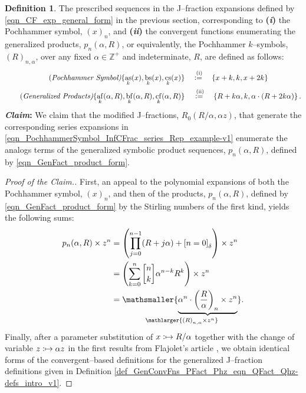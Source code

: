 \documentclass[12pt,reqno]{article}
\numberwithin{sfootnote}{section}
\numberwithin{equation}{section}
\theoremstyle{DefaultTheoremStyle}
\theoremstyle{definition}
\newtheorem{definition}[theorem]{Definition}
\newcommand{\defequals}{\ensuremath{\vcentcolon=}}
\newcommand{\defmapsto}{\ensuremath{\vcentcolon\mapsto}}
\newcommand{\undersetbrace}[2]{\ensuremath{\underset{\mathlarger{#1}}{\mathsmaller{\underbrace{#2}}}}}
\newcommand{\gkpSI}[2]{\ensuremath{\genfrac{\lbrack}{\rbrack}{0pt}{}{#1}{#2}}}
\newcommand{\Pochhammer}[2]{\ensuremath{\left(#1\right)_{#2}}}
\newcommand{\Iverson}[1]{\ensuremath{\left[#1\right]_{\delta}}}
\newcommand{\pn}[3]{\ensuremath{p_{#1}\left(#2, #3\right)}}
\DeclareMathOperator{\as}{as}
\DeclareMathOperator{\bs}{bs}
\DeclareMathOperator{\cs}{cs}
\DeclareMathOperator{\af}{af}
\DeclareMathOperator{\bfcf}{bf}
\DeclareMathOperator{\cfcf}{cf}
\begin{document}
\begin{definition} 
The prescribed sequences in the J--fraction expansions defined by 
\eqref{eqn_CF_exp_general_form} in the previous section, corresponding to 
\textbf{(\emph{i})} the 
Pochhammer symbol, $\Pochhammer{x}{n}$, and 
\textbf{(\emph{ii})} the 
convergent functions enumerating the generalized products, 
$\pn{n}{\alpha}{R}$, or equivalently, the 
Pochhammer $k$--symbols, $\Pochhammer{R}{n,\alpha}$, 
over any fixed $\alpha \in \mathbb{Z}^{+}$ and 
indeterminate, $R$, are defined as follows: 
\begin{align*} 
\tag{\em Pochhammer Symbol} 
\{\as_k(x), \bs_k(x), \cs_k(x)\} & 
     \quad\overset{\text{ (i)}}{\defequals}\quad 
     \left\{ x+k, k, x+2k \right\} \\ 
\tag{\em Generalized Products} 
\{\af_k(\alpha, R), \bfcf_k(\alpha, R), \cfcf_k(\alpha, R)\} & 
     \quad\overset{\text{ (ii)}}{\defequals}\quad 
     \left\{ 
     R+k\alpha, k, \alpha \cdot (R+2k \alpha) 
     \right\}.  
\end{align*} 
\textbf{\textit{Claim}:} 
We claim that the modified J--fractions, $R_0(R / \alpha, \alpha z)$, 
that generate the corresponding series expansions in 
\eqref{eqn_PochhammerSymbol_InfCFrac_series_Rep_example-v1} 
enumerate the analogs terms of the generalized 
symbolic product sequences, $\pn{n}{\alpha}{R}$, 
defined by \eqref{eqn_GenFact_product_form}. 
\end{definition} 
\begin{proof}[Proof of the Claim.] 
First, an appeal to the polynomial expansions of both the 
Pochhammer symbol, $\Pochhammer{x}{n}$, and 
then of the products, $\pn{n}{\alpha}{R}$, 
defined by \eqref{eqn_GenFact_product_form} by the 
Stirling numbers of the first kind, yields the following sums: 
\begin{align} 
\notag 
p_n(\alpha, R) \times z^n & = 
     \left( 
     \prod_{j=0}^{n-1} (R+j\alpha) + \Iverson{n = 0} 
     \right) \times z^n \\ 
\notag 
   & = 
     \left( 
     \sum_{k=0}^{n} \gkpSI{n}{k} \alpha^{n-k} R^{k} 
     \right) \times z^{n} \\ 
\label{eqn_gen_pnAlphaR_seq_PochhammerSymbol_exps} 
   & = 
     \undersetbrace{\Pochhammer{R}{n,\alpha} \times z^{n}}{ 
     \alpha^{n} \cdot \Pochhammer{\frac{R}{\alpha}}{n} 
     \times z^{n}
     }. 
\end{align} 
Finally, after a parameter substitution of 
$x \defmapsto R / \alpha$ together with the change of variable 
$z \defmapsto \alpha z$ in the first results from 
Flajolet's article \citep{FLAJOLET80B}, 
we obtain identical forms of the convergent--based definitions for the 
generalized J--fraction definitions given in 
Definition \ref{def_GenConvFns_PFact_Phz_eqn_QFact_Qhz-defs_intro_v1}. 
\end{proof} 
\end{document}
